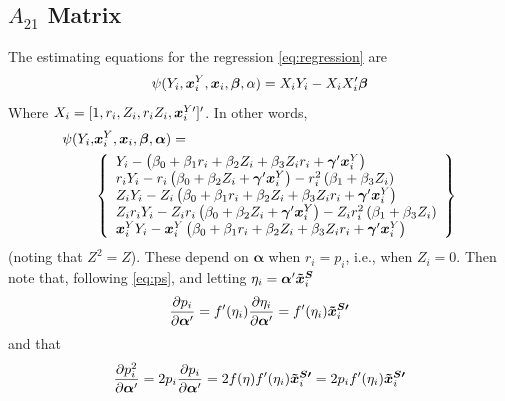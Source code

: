 \documentclass[]{article}
\begin{document}
\subsection*{$A_{21}$ Matrix}
The estimating equations for the regression \eqref{eq:regression} are
\begin{equation}\label{eq:eeOLS}
  \psi(Y_i,\bm{x}^Y_i,\bm{x}_i,\bm{\beta},\alpha)=X_iY_i-X_iX_i'\bm{\beta}
\end{equation}
Where $X_i=[1,r_i,Z_i,r_iZ_i,\bm{x}^{Y\prime}_i]'$.
In other words,
\begin{align*}
  \psi(Y_i,&\bm{x}^Y_i,\bm{x}_i,\bm{\beta},\bm{\alpha})=\\
  &\left\{
  \begin{array}{l}
    Y_i-\left(\beta_0+\beta_1r_i+\beta_2Z_i+\beta_3Z_ir_i+\bm{\gamma}'\bm{x}^Y_i\right)\\
    r_iY_i-r_i\left(\beta_0+\beta_2Z_i+\bm{\gamma}'\bm{x}^Y_i\right)-r_i^2\left(\beta_1+\beta_3Z_i\right)\\
    Z_iY_i-Z_i\left(\beta_0+\beta_1r_i+\beta_2Z_i+\beta_3Z_ir_i+\bm{\gamma}'\bm{x}^Y_i\right)\\
    Z_ir_iY_i-Z_ir_i\left(\beta_0+\beta_2Z_i+\bm{\gamma}'\bm{x}^Y_i\right)-Z_ir_i^2\left(\beta_1+\beta_3Z_i\right)\\
    \bm{x}^Y_iY_i-\bm{x}^Y_i\left(\beta_0+\beta_1r_i+\beta_2Z_i+\beta_3Z_ir_i+\bm{\gamma}'\bm{x}^Y_i\right)
  \end{array}
  \right\}
\end{align*}
(noting that $Z^2=Z$).
These depend on $\bm{\alpha}$ when $r_i=p_i$, i.e., when $Z_i=0$.%
Then note that, following \eqref{eq:ps}, and letting $\eta_i=\bm{\alpha}'\bm{\tilde{x}^S}_i$
\begin{equation}\label{eq:derivP}
  \frac{\partial p_i}{\partial \bm{\alpha}'}=f'(\eta_i)\frac{\partial \eta_i}{\partial \bm{\alpha}'}=f'(\eta_i)\bm{\tilde{x}^{S\prime}}_i
\end{equation}
and that
\begin{equation}
  \frac{\partial p_i^2}{\partial \bm{\alpha}'}=2p_i\frac{\partial p_i}{\partial \bm{\alpha}'}=2f(\eta)f'(\eta_i)\bm{\tilde{x}^{S\prime}}_i=2p_if'(\eta_i)\bm{\tilde{x}^{S\prime}}_i
\end{equation}
\end{document}
